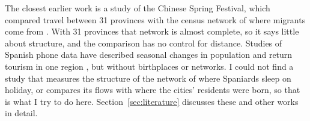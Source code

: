 The closest earlier work is a study of the Chinese Spring Festival, which compared travel between 31 provinces with the census network of where migrants come from \citep{li2016spring}. With 31 provinces that network is almost complete, so it says little about structure, and the comparison has no control for distance. Studies of Spanish phone data have described seasonal changes in population \citep{garzon2026heritage} and return tourism in one region \citep{garciagonzalez2024retorno}, but without birthplaces or networks. I could not find a study that measures the structure of the network of where Spaniards sleep on holiday, or compares its flows with where the cities' residents were born, so that is what I try to do here. Section~\ref{sec:literature} discusses these and other works in detail.
